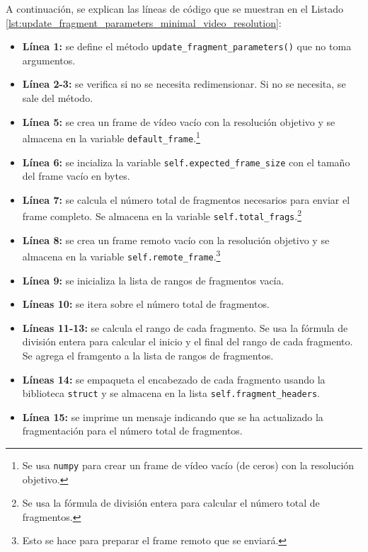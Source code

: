 A continuación, se explican las líneas de código que se muestran en el Listado \ref{lst:update_fragment_parameters_minimal_video_resolution}:
\begin{itemize}
    \item \textbf{Línea 1:} se define el método \texttt{update\_fragment\_parameters()} que no toma argumentos.
    \item \textbf{Línea 2-3:} se verifica si no se necesita redimensionar. Si no se necesita, se sale del método.
    \item \textbf{Línea 5:} se crea un frame de vídeo vacío con la resolución objetivo y se almacena en la variable \texttt{default\_frame}.\footnote{Se usa \texttt{numpy} para crear un frame de vídeo vacío (de ceros) con la resolución objetivo.}
    \item \textbf{Línea 6:} se incializa la variable \texttt{self.expected\_frame\_size} con el tamaño del frame vacío en bytes.
    \item \textbf{Línea 7:} se calcula el número total de fragmentos necesarios para enviar el frame completo. Se almacena en la variable \texttt{self.total\_frags}.\footnote{Se usa la fórmula de división entera para calcular el número total de fragmentos.}
    \item \textbf{Línea 8:} se crea un frame remoto vacío con la resolución objetivo y se almacena en la variable \texttt{self.remote\_frame}.\footnote{Esto se hace para preparar el frame remoto que se enviará.}
    \item \textbf{Línea 9:} se inicializa la lista de rangos de fragmentos vacía.
    \item \textbf{Líneas 10:} se itera sobre el número total de fragmentos.
    \item \textbf{Líneas 11-13:} se calcula el rango de cada fragmento. Se usa la fórmula de división entera para calcular el inicio y el final del rango de cada fragmento. Se agrega el framgento a la lista de rangos de fragmentos.
    \item \textbf{Líneas 14:} se empaqueta el encabezado de cada fragmento usando la biblioteca \texttt{struct} y se almacena en la lista \texttt{self.fragment\_headers}.
    \item \textbf{Línea 15:} se imprime un mensaje indicando que se ha actualizado la fragmentación para el número total de fragmentos.
\end{itemize}
\vspace{\baselineskip}

